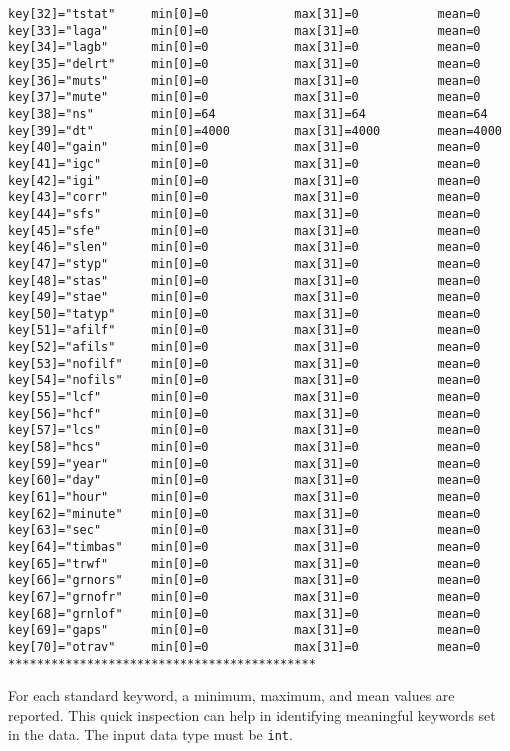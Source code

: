 \begin{verbatim}
key[32]="tstat"     min[0]=0            max[31]=0           mean=0
key[33]="laga"      min[0]=0            max[31]=0           mean=0
key[34]="lagb"      min[0]=0            max[31]=0           mean=0
key[35]="delrt"     min[0]=0            max[31]=0           mean=0
key[36]="muts"      min[0]=0            max[31]=0           mean=0
key[37]="mute"      min[0]=0            max[31]=0           mean=0
key[38]="ns"        min[0]=64           max[31]=64          mean=64
key[39]="dt"        min[0]=4000         max[31]=4000        mean=4000
key[40]="gain"      min[0]=0            max[31]=0           mean=0
key[41]="igc"       min[0]=0            max[31]=0           mean=0
key[42]="igi"       min[0]=0            max[31]=0           mean=0
key[43]="corr"      min[0]=0            max[31]=0           mean=0
key[44]="sfs"       min[0]=0            max[31]=0           mean=0
key[45]="sfe"       min[0]=0            max[31]=0           mean=0
key[46]="slen"      min[0]=0            max[31]=0           mean=0
key[47]="styp"      min[0]=0            max[31]=0           mean=0
key[48]="stas"      min[0]=0            max[31]=0           mean=0
key[49]="stae"      min[0]=0            max[31]=0           mean=0
key[50]="tatyp"     min[0]=0            max[31]=0           mean=0
key[51]="afilf"     min[0]=0            max[31]=0           mean=0
key[52]="afils"     min[0]=0            max[31]=0           mean=0
key[53]="nofilf"    min[0]=0            max[31]=0           mean=0
key[54]="nofils"    min[0]=0            max[31]=0           mean=0
key[55]="lcf"       min[0]=0            max[31]=0           mean=0
key[56]="hcf"       min[0]=0            max[31]=0           mean=0
key[57]="lcs"       min[0]=0            max[31]=0           mean=0
key[58]="hcs"       min[0]=0            max[31]=0           mean=0
key[59]="year"      min[0]=0            max[31]=0           mean=0
key[60]="day"       min[0]=0            max[31]=0           mean=0
key[61]="hour"      min[0]=0            max[31]=0           mean=0
key[62]="minute"    min[0]=0            max[31]=0           mean=0
key[63]="sec"       min[0]=0            max[31]=0           mean=0
key[64]="timbas"    min[0]=0            max[31]=0           mean=0
key[65]="trwf"      min[0]=0            max[31]=0           mean=0
key[66]="grnors"    min[0]=0            max[31]=0           mean=0
key[67]="grnofr"    min[0]=0            max[31]=0           mean=0
key[68]="grnlof"    min[0]=0            max[31]=0           mean=0
key[69]="gaps"      min[0]=0            max[31]=0           mean=0
key[70]="otrav"     min[0]=0            max[31]=0           mean=0
*******************************************
\end{verbatim}
For each standard keyword, a minimum, maximum, and mean values are reported.
This quick inspection can help in identifying meaningful keywords set in the
data. The input data type must be \texttt{int}.


